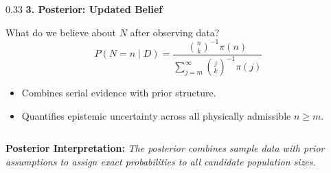 \documentclass[aspectratio=169,10pt]{beamer}
\begin{document}
\begin{frame}[c]
\begin{columns}[t,onlytextwidth]
    \begin{column}{0.33\textwidth}
      {\small \textbf{\color{headernavy} 3. Posterior: Updated Belief}}\\[0.06cm]
      {\scriptsize What do we believe about $N$ after observing data?
      \begin{equation*}
        \boxed{P(N = n \mid D) = \frac{\binom{n}{k}^{-1} \pi(n)}{\sum_{j=m}^\infty \binom{j}{k}^{-1} \pi(j)}}
      \end{equation*}
      \begin{itemize}
        \setlength{\itemsep}{0.06cm}
        \item Combines serial evidence with prior structure.
        \item Quantifies epistemic uncertainty across all physically admissible $n \ge m$.
      \end{itemize}}
    \end{column}
  \end{columns}
  
  \vspace{0.30cm}
  \begin{center}
    {\footnotesize \textbf{\color{headernavy} Posterior Interpretation: } \textit{The posterior combines sample data with prior assumptions to assign exact probabilities to all candidate population sizes.}}
  \end{center}
\end{frame}
\end{document}
